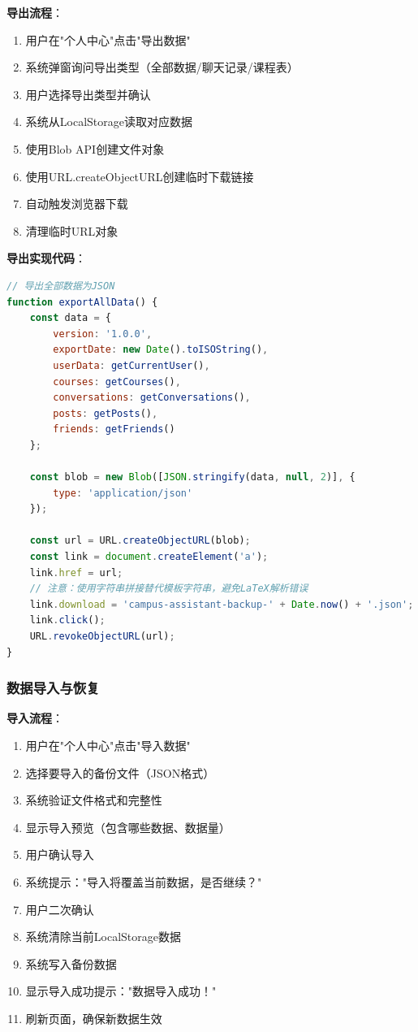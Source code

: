 \documentclass[12pt,a4paper]{article}
\begin{document}
\textbf{导出流程}：
\begin{enumerate}
    \item 用户在"个人中心"点击"导出数据"
    \item 系统弹窗询问导出类型（全部数据/聊天记录/课程表）
    \item 用户选择导出类型并确认
    \item 系统从LocalStorage读取对应数据
    \item 使用Blob API创建文件对象
    \item 使用URL.createObjectURL创建临时下载链接
    \item 自动触发浏览器下载
    \item 清理临时URL对象
\end{enumerate}

\textbf{导出实现代码}：
\begin{lstlisting}[language=JavaScript]
// 导出全部数据为JSON
function exportAllData() {
    const data = {
        version: '1.0.0',
        exportDate: new Date().toISOString(),
        userData: getCurrentUser(),
        courses: getCourses(),
        conversations: getConversations(),
        posts: getPosts(),
        friends: getFriends()
    };
    
    const blob = new Blob([JSON.stringify(data, null, 2)], {
        type: 'application/json'
    });
    
    const url = URL.createObjectURL(blob);
    const link = document.createElement('a');
    link.href = url;
    // 注意：使用字符串拼接替代模板字符串，避免LaTeX解析错误
    link.download = 'campus-assistant-backup-' + Date.now() + '.json';
    link.click();
    URL.revokeObjectURL(url);
}
\end{lstlisting}

\subsubsection{数据导入与恢复}

\textbf{导入流程}：
\begin{enumerate}
    \item 用户在"个人中心"点击"导入数据"
    \item 选择要导入的备份文件（JSON格式）
    \item 系统验证文件格式和完整性
    \item 显示导入预览（包含哪些数据、数据量）
    \item 用户确认导入
    \item 系统提示："导入将覆盖当前数据，是否继续？"
    \item 用户二次确认
    \item 系统清除当前LocalStorage数据
    \item 系统写入备份数据
    \item 显示导入成功提示："数据导入成功！"
    \item 刷新页面，确保新数据生效
\end{enumerate}
\end{document}

